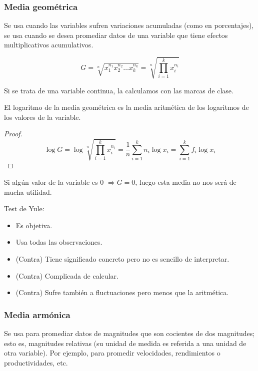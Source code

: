 \subsubsection{Media geométrica}

Se usa cuando las variables sufren variaciones acumuladas (como en porcentajes), se usa cuando se desea promediar
datos de una variable que tiene efectos multiplicativos acumulativos.

$$G=\sqrt[n]{x_1^{n_1} x_2^{n_2} \ldots x_k^{n_k}} = \sqrt[n]{\prod_{i=1}^{k}x_i^{n_i}}$$

Si se trata de una variable continua, la calculamos con las marcas de clase.

\begin{prop}
    El logaritmo de la media geométrica	es la media aritmética de los logaritmos de los valores de la variable.
\end{prop}
\begin{proof}
    $$\log G = \log \sqrt[n]{\prod_{i=1}^k x_i^{n_i}} = \dfrac{1}{n} \sum_{i=1}^k n_i \log x_i = \sum_{i=1}^k f_i \log x_i $$
\end{proof}

\begin{observacion}
    Si algún valor de la variable es 0 $\Rightarrow G=0$, luego esta media no nos será de mucha utilidad.
\end{observacion}

\noindent Test de Yule:
\begin{itemize}
    \item Es objetiva.
    \item Usa todas las observaciones.
    \item (Contra) Tiene significado concreto pero no es sencillo de interpretar.
    \item (Contra) Complicada de calcular.
    \item (Contra) Sufre también a fluctuaciones pero menos que la aritmética.
\end{itemize}

\subsubsection{Media armónica}

Se usa para promediar datos de magnitudes que son cocientes de dos magnitudes; esto es, magnitudes relativas
(su unidad de medida es referida a una unidad de otra variable). Por ejemplo, para promedir velocidades,
rendimientos o productividades, etc.

